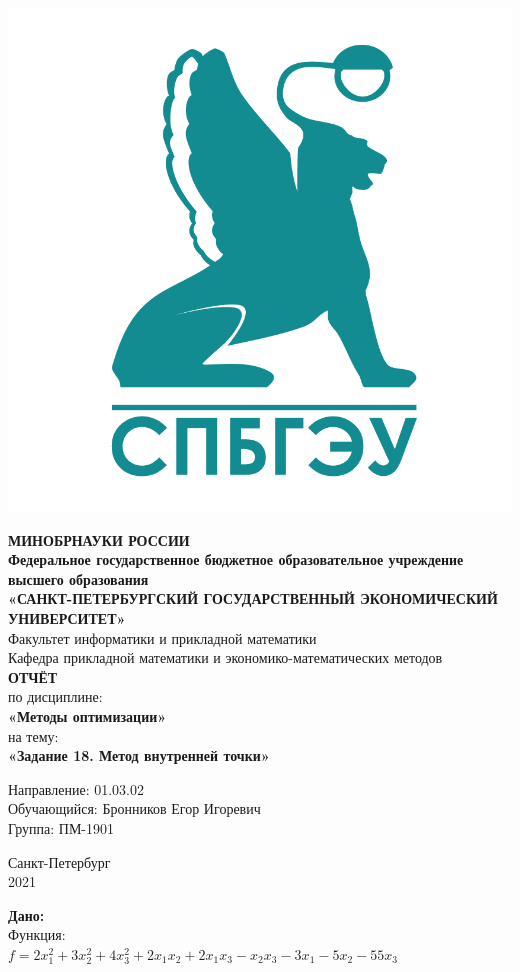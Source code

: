 \documentclass[14pt,a4paper,fleqn]{extarticle}
\begin{document}
	\begin{titlepage}
		\includegraphics[scale=0.12]{logo}
		\begin{center}
			\textbf{МИНОБРНАУКИ РОССИИ}\\
			\vspace{0.2cm}
			\textbf{Федеральное государственное бюджетное образовательное учреждение высшего образования}\\
			\textbf{«САНКТ-ПЕТЕРБУРГСКИЙ ГОСУДАРСТВЕННЫЙ ЭКОНОМИЧЕСКИЙ УНИВЕРСИТЕТ»}\\
			\vspace{0.6cm}
			Факультет информатики и прикладной математики\\
			Кафедра прикладной математики и экономико-математических методов\\
			\vspace{1cm}
			\textbf{ОТЧЁТ}\\
			по дисциплине:\\
			\textbf{«Методы оптимизации»}\\
			на тему:\\
			\textbf{«Задание 18. Метод внутренней точки»}\\
		\end{center}
		\vspace{1cm}
		Направление: 01.03.02\\
		Обучающийся: Бронников Егор Игоревич\\
		Группа: ПМ-1901\\
		\vfill
		\begin{center}
			Санкт-Петербург\\
			2021\\
		\end{center}
	\end{titlepage}
	\textbf{Дано:}\\
	Функция:\\
	$f = 2x_1^2 + 3x_2^2 + 4x_3^2 + 2x_1x_2 + 2x_1x_3 - x_2x_3 - 3x_1 - 5x_2 - 55x_3$\\
	
\end{document}
